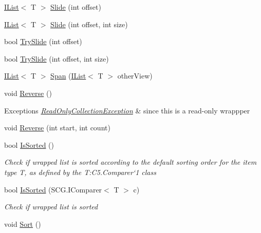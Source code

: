 \begin{DoxyCompactItemize}
\hyperlink{interface_c5_1_1_i_list}{I\+List}$<$ T $>$ \hyperlink{class_c5_1_1_guarded_list_a3faccf4fac5e82c8d247b454c3480d81}{Slide} (int offset)
\item 
\hyperlink{interface_c5_1_1_i_list}{I\+List}$<$ T $>$ \hyperlink{class_c5_1_1_guarded_list_a0ce13254cd6bbac5a432abd0ce087871}{Slide} (int offset, int size)
\item 
bool \hyperlink{class_c5_1_1_guarded_list_a6f223ae232ecbcaf3ce345fb86b6e3fd}{Try\+Slide} (int offset)
\item 
bool \hyperlink{class_c5_1_1_guarded_list_aa7279ed330a84a39007653b6cad41b54}{Try\+Slide} (int offset, int size)
\item 
\hyperlink{interface_c5_1_1_i_list}{I\+List}$<$ T $>$ \hyperlink{class_c5_1_1_guarded_list_a4e0d1abd08021423cef51045659bb0c3}{Span} (\hyperlink{interface_c5_1_1_i_list}{I\+List}$<$ T $>$ other\+View)
\item 
void \hyperlink{class_c5_1_1_guarded_list_a22e4adae5aa8ea5588dd9828257e9e65}{Reverse} ()
\begin{DoxyCompactList}\small\item\em 
\begin{DoxyExceptions}{Exceptions}
{\em \hyperlink{class_c5_1_1_read_only_collection_exception}{Read\+Only\+Collection\+Exception}} & since this is a read-\/only wrappper\\
\hline
\end{DoxyExceptions}
\end{DoxyCompactList}\item 
void \hyperlink{class_c5_1_1_guarded_list_aba5504744b39e081df582fe55c958652}{Reverse} (int start, int count)
\item 
bool \hyperlink{class_c5_1_1_guarded_list_a7f201d294ec23f1231ddf27350657537}{Is\+Sorted} ()
\begin{DoxyCompactList}\small\item\em Check if wrapped list is sorted according to the default sorting order for the item type T, as defined by the T\+:\+C5.\+Comparer`1 class \end{DoxyCompactList}\item 
bool \hyperlink{class_c5_1_1_guarded_list_a1a24999c136d34605f5d6b2f004e8610}{Is\+Sorted} (S\+C\+G.\+I\+Comparer$<$ T $>$ c)
\begin{DoxyCompactList}\small\item\em Check if wrapped list is sorted \end{DoxyCompactList}\item 
void \hyperlink{class_c5_1_1_guarded_list_abbc6eedd317b8fb232dd803739867d72}{Sort} ()

\end{DoxyCompactItemize}
